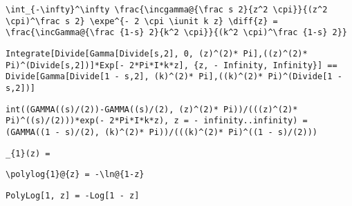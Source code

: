 \newsavebox\BBST
\begin{lrbox}{\BBST}
 \begin{minipage}[t]{0.82\textwidth}
  \lstinline[language={[latex]TeX},mathescape,breaklines=true]"\int_{-\infty}^\infty \frac{\incgamma@{\frac s 2}{z^2 \cpi}}{(z^2 \cpi)^\frac s 2} \expe^{- 2 \cpi \iunit k z} \diff{z} = \frac{\incGamma@{\frac {1-s} 2}{k^2 \cpi}}{(k^2 \cpi)^\frac {1-s} 2}}"
 \end{minipage}
\end{lrbox}
\newsavebox\BBMM
\begin{lrbox}{\BBMM}
 \begin{minipage}[t]{0.82\textwidth}
  \lstinline[language={[latex]TeX},mathescape,breaklines=true]"Integrate[Divide[Gamma[Divide[s,2], 0, (z)^(2)* Pi],((z)^(2)* Pi)^(Divide[s,2])]*Exp[- 2*Pi*I*k*z], {z, - Infinity, Infinity}] == Divide[Gamma[Divide[1 - s,2], (k)^(2)* Pi],((k)^(2)* Pi)^(Divide[1 - s,2])]"
 \end{minipage}
\end{lrbox}
\newsavebox\BBMA
\begin{lrbox}{\BBMA}
 \begin{minipage}[t]{0.82\textwidth}
  \lstinline[language={[latex]TeX},mathescape,breaklines=true]"int((GAMMA((s)/(2))-GAMMA((s)/(2), (z)^(2)* Pi))/(((z)^(2)* Pi)^((s)/(2)))*exp(- 2*Pi*I*k*z), z = - infinity..infinity) = (GAMMA((1 - s)/(2), (k)^(2)* Pi))/(((k)^(2)* Pi)^((1 - s)/(2)))"
 \end{minipage}
\end{lrbox}
\newsavebox\BCT
\begin{lrbox}{\BCT}
 \begin{minipage}[t]{0.82\textwidth}
  \lstinline[language={[latex]TeX},mathescape,breaklines=true]"_{1}(z) ="
 \end{minipage}
\end{lrbox}
\newsavebox\BCST
\begin{lrbox}{\BCST}
 \begin{minipage}[t]{0.82\textwidth}
  \lstinline[language={[latex]TeX},mathescape,breaklines=true]"\polylog{1}@{z} = -\ln@{1-z}"
 \end{minipage}
\end{lrbox}
\newsavebox\BCMM
\begin{lrbox}{\BCMM}
 \begin{minipage}[t]{0.82\textwidth}
  \lstinline[language={[latex]TeX},mathescape,breaklines=true]"PolyLog[1, z] = -Log[1 - z]"
 \end{minipage}
\end{lrbox}
